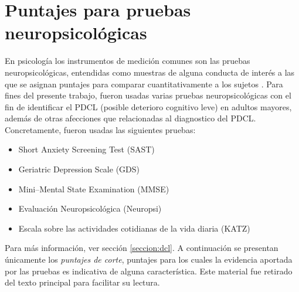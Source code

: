 \documentclass[12pt,letterpaper,draft]{book}
\begin{document}
\appendix


\chapter{Puntajes para pruebas neuropsicológicas}
\label{apendice_pruebas}


En psicología los instrumentos de medición comunes son las pruebas neuropsicológicas, entendidas como muestras de alguna conducta de interés a las que se asignan puntajes para comparar cuantitativamente a los sujetos \cite{Ardila12}. 
%
%
Para fines del presente trabajo, fueron usadas varias pruebas neuropsicológicas con el fin de identificar el PDCL (posible deterioro cognitivo leve) en adultos mayores, además de otras afecciones que relacionadas al diagnostico del PDCL.
%
Concretamente, fueron usadas las siguientes pruebas:
\begin{itemize}
\item {Short Anxiety Screening Test (SAST)} 
\item {Geriatric Depression Scale (GDS)}
\item {Mini--Mental State Examination (MMSE)}
\item {Evaluación Neuropsicológica (Neuropsi)}
\item {Escala sobre las actividades cotidianas de la vida diaria (KATZ)}
\end{itemize}

Para más información, ver sección \ref{seccion:dcl}.
%
A continuación se presentan únicamente los \textit{puntajes de corte}, puntajes para los cuales la evidencia aportada por las pruebas es indicativa de alguna característica.
%
Este material fue retirado del texto principal para facilitar su lectura.
\end{document}
